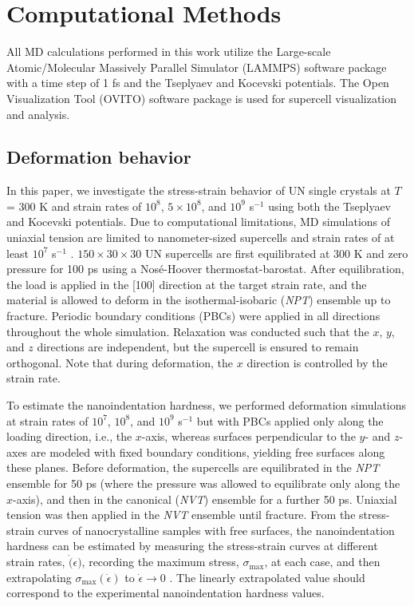 \documentclass[applsci,article,submit,pdftex,moreauthors]{Definitions/mdpi}
\newcommand{\?}{\stackrel{?}{=}}
\begin{document}
\section{Computational Methods}

All MD calculations performed in this work utilize the Large-scale Atomic/Molecular Massively Parallel Simulator (LAMMPS) software package \cite{Thompson2022} with a time step of 1 fs and the Tseplyaev \cite{Tseplyaev2016} and Kocevski \cite{Kocevski2022II} potentials. The Open Visualization Tool (OVITO) software package \cite{Stukowski2010} is used for supercell visualization and analysis.

\subsection{Deformation behavior}

In this paper, we investigate the stress-strain behavior of UN single crystals at $T$ = 300 K and strain rates of $10^8$, $5 \times 10^8$, and $10^9$ s$^{-1}$ using both the Tseplyaev and Kocevski potentials. Due to computational limitations, MD simulations of uniaxial tension are limited to nanometer-sized supercells and strain rates of at least $10^7$ s$^{-1}$ \cite{Lao2013}. $150 \times 30 \times 30$ UN supercells are first equilibrated at 300 K and zero pressure for 100 ps using a Nosé-Hoover thermostat-barostat. After equilibration, the load is applied in the [100] direction at the target strain rate, and the material is allowed to deform in the isothermal-isobaric (\textit{NPT}) ensemble up to fracture. Periodic boundary conditions (PBCs) were applied in all directions throughout the whole simulation. Relaxation was conducted such that the $x$, $y$, and $z$ directions are independent, but the supercell is ensured to remain orthogonal. Note that during deformation, the $x$ direction is controlled by the strain rate.

To estimate the nanoindentation hardness, we performed deformation simulations at strain rates of $10^7$, $10^8$, and $10^9$ s$^{-1}$ but with PBCs applied only along the loading direction, i.e., the $x$-axis, whereas surfaces perpendicular to the $y$- and $z$-axes are modeled with fixed boundary conditions, yielding free surfaces along these planes. Before deformation, the supercells are equilibrated in the \textit{NPT} ensemble for 50 ps (where the pressure was allowed to equilibrate only along the $x$-axis), and then in the canonical (\textit{NVT}) ensemble for a further 50 ps. Uniaxial tension was then applied in the \textit{NVT} ensemble until fracture. From the stress-strain curves of nanocrystalline samples with free surfaces, the nanoindentation hardness can be estimated by measuring the stress-strain curves at different strain rates, $\Dot(\epsilon)$, recording the maximum stress, $\sigma_\mathrm{max}$, at each case, and then extrapolating $\sigma_\mathrm{max}(\Dot{\epsilon})$ to $\Dot{\epsilon} \rightarrow 0$ \cite{Ivashchenko2007}. The linearly extrapolated value should correspond to the experimental nanoindentation hardness values.
\end{document}
